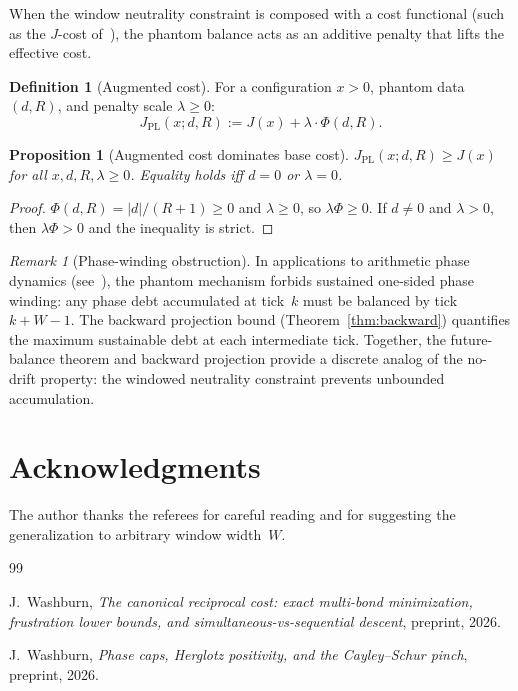 \documentclass[11pt]{amsart}
\newtheorem{proposition}[theorem]{Proposition}
\theoremstyle{definition}
\newtheorem{definition}[theorem]{Definition}
\theoremstyle{remark}
\newtheorem{remark}[theorem]{Remark}
\begin{document}
When the window neutrality constraint is composed with a cost functional
(such as the $J$-cost of~\cite{F1}), the phantom balance acts as an
additive penalty that lifts the effective cost.

\begin{definition}[Augmented cost]\label{def:augmented}
For a configuration $x>0$, phantom data $(d,R)$, and
penalty scale $\lambda\ge 0$:
\[
J_{\mathrm{PL}}(x;d,R):=J(x)+\lambda\cdot\Phi(d,R).
\]
\end{definition}

\begin{proposition}[Augmented cost dominates base cost]\label{prop:augmented}
$J_{\mathrm{PL}}(x;d,R)\ge J(x)$ for all $x,d,R,\lambda\ge0$.
Equality holds iff $d=0$ or $\lambda=0$.
\end{proposition}
\begin{proof}
$\Phi(d,R)=|d|/(R+1)\ge0$ and $\lambda\ge0$, so
$\lambda\Phi\ge0$.  If $d\neq0$ and $\lambda>0$, then $\lambda\Phi>0$
and the inequality is strict.
\end{proof}

\begin{remark}[Phase-winding obstruction]
In applications to arithmetic phase dynamics (see~\cite{F4}),
the phantom mechanism forbids sustained one-sided phase winding:
any phase debt accumulated at tick~$k$ must be balanced by tick~$k{+}W{-}1$.
The backward projection bound (Theorem~\ref{thm:backward}) quantifies
the maximum sustainable debt at each intermediate tick.
Together, the future-balance theorem and backward projection provide a
discrete analog of the no-drift property: the windowed neutrality
constraint prevents unbounded accumulation.
\end{remark}

\section*{Acknowledgments}
The author thanks the referees for careful reading and for suggesting
the generalization to arbitrary window width~$W$.

\begin{thebibliography}{99}

J.~Washburn,
\emph{The canonical reciprocal cost: exact multi-bond minimization,
frustration lower bounds, and simultaneous-vs-sequential descent},
preprint, 2026.

J.~Washburn,
\emph{Phase caps, Herglotz positivity, and the Cayley--Schur pinch},
preprint, 2026.

\end{thebibliography}
\end{document}
